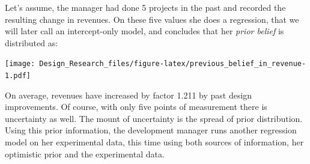 \documentclass[]{svmono}
\newenvironment{Shaded}{\begin{snugshade}}{\end{snugshade}}
\newcommand{\KeywordTok}[1]{\textcolor[rgb]{0.13,0.29,0.53}{\textbf{#1}}}
\newcommand{\DataTypeTok}[1]{\textcolor[rgb]{0.13,0.29,0.53}{#1}}
\newcommand{\DecValTok}[1]{\textcolor[rgb]{0.00,0.00,0.81}{#1}}
\newcommand{\StringTok}[1]{\textcolor[rgb]{0.31,0.60,0.02}{#1}}
\newcommand{\OperatorTok}[1]{\textcolor[rgb]{0.81,0.36,0.00}{\textbf{#1}}}
\newcommand{\NormalTok}[1]{#1}
\theoremstyle{definition}
\theoremstyle{definition}
\theoremstyle{definition}
\theoremstyle{remark}
\begin{document}
\begin{Shaded}
\end{Shaded}

Let's assume, the manager had done 5 projects in the past and recorded
the resulting change in revenues. On these five values she does a
regression, that we will later call an intercept-only model, and
concludes that her \emph{prior belief} is distributed as:

\begin{Shaded}
\end{Shaded}

\texttt{[image: Design\_Research\_files/figure-latex/previous\_belief\_in\_revenue-1.pdf]}

On average, revenues have increased by factor 1.211 by past design
improvements. Of course, with only five points of measurement there is
uncertainty as well. The mount of uncertainty is the spread of prior
distribution. Using this prior information, the development manager runs
another regression model on her experimental data, this time using both
sources of information, her optimistic prior and the experimental data.
\end{document}
